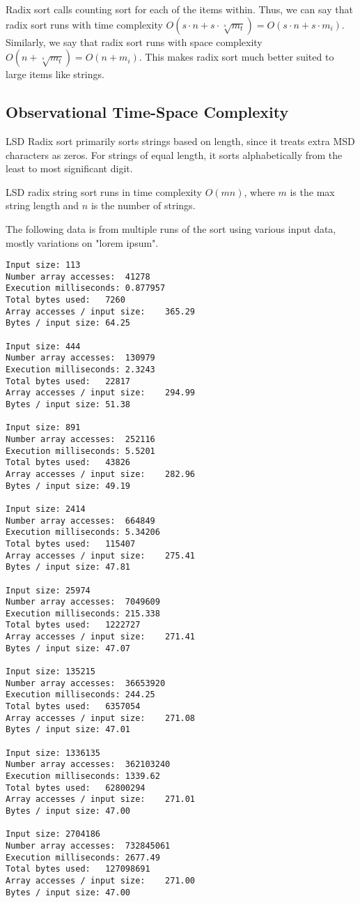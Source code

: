 \documentclass[12pt]{amsart}
\begin{document}
    Radix sort calls counting sort for each of the items
    within. Thus, we can say that radix sort runs with time complexity
    $O(s \cdot n + s \cdot \sqrt[s]{m_t}) = O(s \cdot n + s \cdot m_i)$.
    Similarly, we say that radix sort runs with space complexity
    $O(n + \sqrt[s]{m_t}) = O(n + m_i)$. This makes radix sort
    much better suited to large items like strings.

    \subsection{Observational Time-Space Complexity}

    LSD Radix sort primarily sorts strings based on length,
    since it treats extra MSD characters as zeros. For strings
    of equal length, it sorts alphabetically from the least to
    most significant digit.

    LSD radix string sort runs in time complexity $O(mn)$, where
    $m$ is the max string length and $n$ is the number of
    strings.

    The following data is from multiple runs of the sort using
    various input data, mostly variations on "lorem ipsum".

    \newpage

\begin{verbatim}
Input size:	113
Number array accesses:	41278
Execution milliseconds:	0.877957
Total bytes used:	7260
Array accesses / input size:    365.29
Bytes / input size: 64.25

Input size:	444
Number array accesses:	130979
Execution milliseconds:	2.3243
Total bytes used:	22817
Array accesses / input size:    294.99
Bytes / input size: 51.38

Input size:	891
Number array accesses:	252116
Execution milliseconds:	5.5201
Total bytes used:	43826
Array accesses / input size:    282.96
Bytes / input size: 49.19

Input size:	2414
Number array accesses:	664849
Execution milliseconds:	5.34206
Total bytes used:	115407
Array accesses / input size:    275.41
Bytes / input size: 47.81

Input size:	25974
Number array accesses:	7049609
Execution milliseconds:	215.338
Total bytes used:	1222727
Array accesses / input size:    271.41
Bytes / input size: 47.07

Input size:	135215
Number array accesses:	36653920
Execution milliseconds:	244.25
Total bytes used:	6357054
Array accesses / input size:    271.08
Bytes / input size: 47.01

Input size:	1336135
Number array accesses:	362103240
Execution milliseconds:	1339.62
Total bytes used:	62800294
Array accesses / input size:    271.01
Bytes / input size: 47.00

Input size:	2704186
Number array accesses:	732845061
Execution milliseconds:	2677.49
Total bytes used:	127098691
Array accesses / input size:    271.00
Bytes / input size: 47.00

\end{verbatim}
\end{document}

